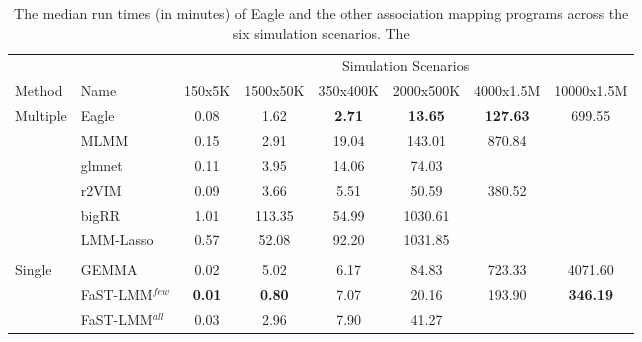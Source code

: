 \documentclass{article}
\begin{document}
\begin{table}
\caption{The median run times (in minutes) of Eagle and the other association mapping programs across the six simulation scenarios. The }
\begin{tabular}{llcccccc}
              &           &  \multicolumn{6}{c}{Simulation Scenarios} \\ \cline{3-8}
 Method & Name & 150x5K & 1500x50K & 350x400K & 2000x500K & 4000x1.5M & 10000x1.5M \\ \hline
  Multiple & Eagle 	&	   0.08  &   1.62   &  \bf{2.7}1  &   \bf{13.65}   & \bf{127.63}  &   699.55  \\
               & MLMM 	&	   0.15    &  2.91    & 19.04  &  143.01  &  870.84  &     \\
               & glmnet 	&	  0.11     & 3.95    & 14.06    & 74.03    &        &    \\
               & r2VIM 	&	   0.09    &  3.66    &  5.51    & 50.59    & 380.52  &   \\ 
               & bigRR 	&	    1.01   & 113.35   &  54.99   & 1030.61  &        &     \\
               & LMM-Lasso 	&     0.57  &   52.08 &    92.20  & 1031.85 &           &     \\ \\
Single     &  GEMMA 	&      0.02  &   5.02   &   6.17  &   84.83   & 723.33  & 4071.60 \\
               & FaST-LMM$^{few}$ 	&    \bf{0.01}   &  \bf{0.80}   &   7.07   &  20.16   & 193.90   & \bf{346.19} \\ 
               & FaST-LMM$^{all}$   	&   0.03   & 2.96  &    7.90   &  41.27  &            &   \\ \hline
\end{tabular}

\end{table}
\end{document}
